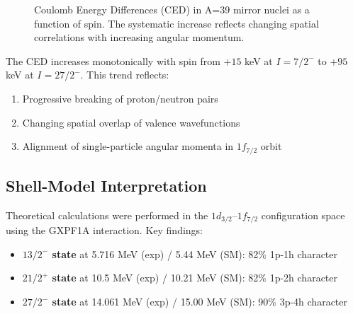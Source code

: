 \begin{figure}[h]
\centering
{}
\caption{Coulomb Energy Differences (CED) in A=39 mirror nuclei as a function of spin. The systematic increase reflects changing spatial correlations with increasing angular momentum.}
\label{fig:a39_ced}
\end{figure}

\begin{remark}
The CED increases monotonically with spin from $+15$ keV at $I=7/2^-$ to $+95$ keV at $I=27/2^-$. This trend reflects:
\begin{enumerate}
    \item Progressive breaking of proton/neutron pairs
    \item Changing spatial overlap of valence wavefunctions
    \item Alignment of single-particle angular momenta in $1f_{7/2}$ orbit
\end{enumerate}
\end{remark}

\subsection{Shell-Model Interpretation}

Theoretical calculations were performed in the $1d_{3/2}$--$1f_{7/2}$ configuration space using the GXPF1A interaction. Key findings:

\begin{itemize}
    \item \textbf{$13/2^-$ state} at 5.716 MeV (exp) / 5.44 MeV (SM): 82\% 1p-1h character
    \item \textbf{$21/2^+$ state} at 10.5 MeV (exp) / 10.21 MeV (SM): 82\% 1p-2h character
    \item \textbf{$27/2^-$ state} at 14.061 MeV (exp) / 15.00 MeV (SM): 90\% 3p-4h character
\end{itemize}

